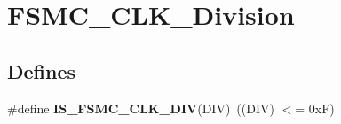 \hypertarget{group__FSMC__CLK__Division}{
\section{FSMC\_\-CLK\_\-Division}
\label{group__FSMC__CLK__Division}
}
\subsection*{Defines}
\begin{DoxyCompactItemize}
\item 
\hypertarget{group__FSMC__CLK__Division_ga9e5321b02ea049fd076ba705acd06b5f}{
\#define {\bfseries IS\_\-FSMC\_\-CLK\_\-DIV}(DIV)~((DIV) $<$= 0xF)}
\label{group__FSMC__CLK__Division_ga9e5321b02ea049fd076ba705acd06b5f}

\end{DoxyCompactItemize}
